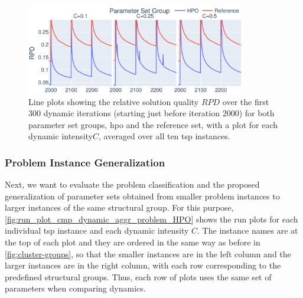 \begin{figure}[h]
	\centering
	\includegraphics[width=0.85\textwidth]{results/part3/run_plot_cmp_folder_aggr_dynamic_y_best_solution_1_to_30_HPO.svg}
	\caption[Line plots showing the relative solution quality $RPD$ over dynamic iterations for both parameter set groups for each dynamic intensity$C$, averaged over \gls{tsp} instances]{Line plots showing the relative solution quality $RPD$ over the first 300 dynamic iterations (starting just before iteration 2000) for both parameter set groups, \gls{hpo} and the reference set, with a plot for each dynamic intensity$C$, averaged over all ten \gls{tsp} instances.}
	\label{fig:run_plot_cmp_folder_aggr_dynamic_HPO}
\end{figure}

\subsubsection{Problem Instance Generalization}
Next, we want to evaluate the problem classification and the proposed generalization of parameter sets obtained from smaller problem instances to larger instances of the same structural group. For this purpose, \cref{fig:run_plot_cmp_dynamic_aggr_problem_HPO} shows the run plots for each individual \gls{tsp} instance and each dynamic intensity $C$. The instance names are at the top of each plot and they are ordered in the same way as before in \cref{fig:cluster-groups}, so that the smaller instances are in the left column and the larger instances are in the right column, with each row corresponding to the predefined structural groups. Thus, each row of plots uses the same set of parameters when comparing dynamics.

